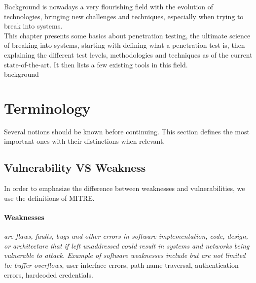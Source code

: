 \begin{chaptercover}{Background}%
{
{\large \hyphenation{}  is nowadays a very flourishing field with the evolution of technologies, bringing new challenges and techniques, especially when trying to break into systems. \newline \\ This chapter presents some basics about penetration testing, the ultimate science of breaking into systems, starting with defining what a penetration test is, then explaining the different test levels, methodologies and techniques as of the current state-of-the-art. It then lists a few existing tools in this field.\newline\\}}%
{background}

\section{Terminology}

Several notions should be known before continuing. This section defines the most important ones with their distinctions when relevant.

\subsection{Vulnerability VS Weakness}\label{subsec:vuln-vs-weakness}

In order to emphasize the difference between weaknesses and vulnerabilities, we use the definitions of MITRE. \cite{mitre}

\paragraph{Weaknesses} \textit{are flaws, faults, bugs and other errors in software implementation, code, design, or architecture that if left unaddressed could result in systems and networks being vulnerable to attack. Example of software weaknesses include but are not limited to: buffer overflows}, user interface errors, path name traversal, authentication errors, hardcoded credentials. \cite{mitre-cwe}


\end{chaptercover}
